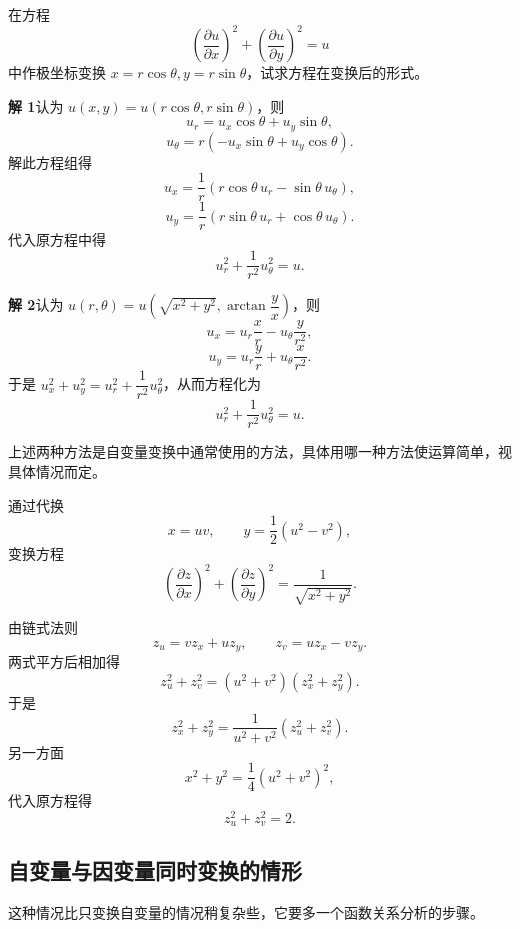 \begin{xexample}[20.3.1]
在方程
\[
  \left(\frac{\partial u}{\partial x}\right)^2+
  \left(\frac{\partial u}{\partial y}\right)^2=u
\]
中作极坐标变换 $x=r\cos\theta,y=r\sin\theta$，试求方程在变换后的形式。
\end{xexample}
\begin{xsolution}
\textbf{解 1}\quad 认为 $u(x,y)=u(r\cos\theta,r\sin\theta)$，则
\[
  u_r=u_x\cos\theta+u_y\sin\theta,
\]
\[
  u_\theta=r(-u_x\sin\theta+u_y\cos\theta).
\]
解此方程组得
\[
  u_x=\frac1r(r\cos\theta\,u_r-\sin\theta\,u_\theta),
\]
\[
  u_y=\frac1r(r\sin\theta\,u_r+\cos\theta\,u_\theta).
\]
代入原方程中得
\[
  u_r^2+\frac1{r^2}u_\theta^2=u.
\]

\textbf{解 2}\quad 认为 $u(r,\theta)=u\left(\sqrt{x^2+y^2},\arctan\dfrac yx\right)$，则
\[
  u_x=u_r\frac xr-u_\theta\frac y{r^2},
\]
\[
  u_y=u_r\frac yr+u_\theta\frac x{r^2}.
\]
于是 $u_x^2+u_y^2=u_r^2+\dfrac1{r^2}u_\theta^2$，从而方程化为
\[
  u_r^2+\frac1{r^2}u_\theta^2=u.
\]
\end{xsolution}

\begin{xremark}
上述两种方法是自变量变换中通常使用的方法，具体用哪一种方法使运算简单，视具体情况而定。
\end{xremark}

\begin{xexample}[20.3.2]
通过代换
\[
  x=uv,\qquad y=\frac12(u^2-v^2),
\]
变换方程
\[
  \left(\frac{\partial z}{\partial x}\right)^2+
  \left(\frac{\partial z}{\partial y}\right)^2
  =\frac1{\sqrt{x^2+y^2}}.
\]
\end{xexample}
\begin{xsolution}
由链式法则
\[
  z_u=vz_x+uz_y,\qquad z_v=uz_x-vz_y.
\]
两式平方后相加得
\[
  z_u^2+z_v^2=(u^2+v^2)(z_x^2+z_y^2).
\]
于是
\[
  z_x^2+z_y^2=\frac1{u^2+v^2}(z_u^2+z_v^2).
\]
另一方面
\[
  x^2+y^2=\frac14(u^2+v^2)^2,
\]
代入原方程得
\[
  z_u^2+z_v^2=2.
\]
\end{xsolution}

\subsection{自变量与因变量同时变换的情形}

这种情况比只变换自变量的情况稍复杂些，它要多一个函数关系分析的步骤。

